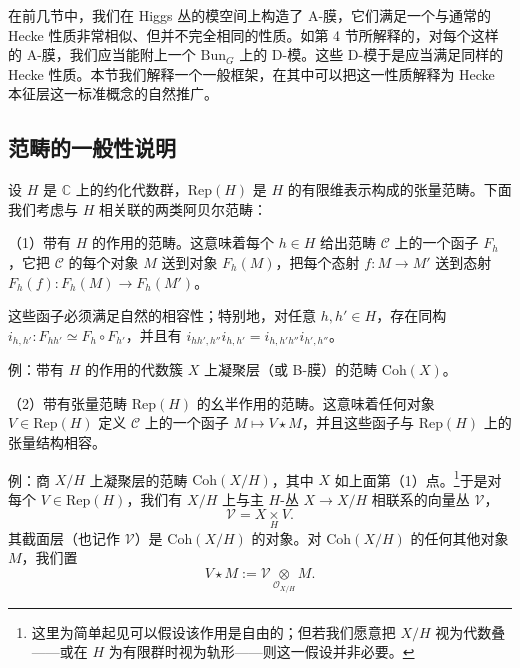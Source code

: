 \documentclass[11pt,a4paper]{article}
\newcommand{\Bun}{\mathrm{Bun}}
\begin{document}
在前几节中，我们在 Higgs 丛的模空间上构造了 A-膜，它们满足一个与通常的 Hecke 性质非常相似、但并不完全相同的性质。如第 4 节所解释的，对每个这样的 A-膜，我们应当能附上一个 $\Bun_G$ 上的 D-模。这些 D-模于是应当满足同样的 Hecke 性质。本节我们解释一个一般框架，在其中可以把这一性质解释为 Hecke 本征层这一标准概念的自然推广。

\subsection{范畴的一般性说明}

设 $H$ 是 $\mathbb{C}$ 上的约化代数群，$\mathrm{Rep}(H)$ 是 $H$ 的有限维表示构成的张量范畴。下面我们考虑与 $H$ 相关联的两类阿贝尔范畴：

（1）带有 $H$ 的作用的范畴。这意味着每个 $h\in H$ 给出范畴 $\mathcal{C}$ 上的一个函子 $F_h$，它把 $\mathcal{C}$ 的每个对象 $M$ 送到对象 $F_h(M)$，把每个态射 $f : M\to M'$ 送到态射 $F_h(f) : F_h(M)\to F_h(M')$。

这些函子必须满足自然的相容性；特别地，对任意 $h,h'\in H$，存在同构 $i_{h,h'} : F_{hh'}\simeq F_h\circ F_{h'}$，并且有 $i_{hh',h''}i_{h,h'} = i_{h,h'h''}i_{h',h''}$。


例：带有 $H$ 的作用的代数簇 $X$ 上凝聚层（或 B-膜）的范畴 $\mathrm{Coh}(X)$。

（2）带有张量范畴 $\mathrm{Rep}(H)$ 的幺半作用的范畴。这意味着任何对象 $V\in\mathrm{Rep}(H)$ 定义 $\mathcal{C}$ 上的一个函子 $M\mapsto V\star M$，并且这些函子与 $\mathrm{Rep}(H)$ 上的张量结构相容。

例：商 $X/H$ 上凝聚层的范畴 $\mathrm{Coh}(X/H)$，其中 $X$ 如上面第（1）点。\footnote{这里为简单起见可以假设该作用是自由的；但若我们愿意把 $X/H$ 视为代数叠——或在 $H$ 为有限群时视为轨形——则这一假设并非必要。}于是对每个 $V\in\mathrm{Rep}(H)$，我们有 $X/H$ 上与主 $H$-丛 $X\to X/H$ 相联系的向量丛 $\mathcal{V}$，
\[
\mathcal{V} = X\underset{H}{\times} V.
\]
其截面层（也记作 $\mathcal{V}$）是 $\mathrm{Coh}(X/H)$ 的对象。对 $\mathrm{Coh}(X/H)$ 的任何其他对象 $M$，我们置
\[
V\star M := \mathcal{V}\underset{\mathcal{O}_{X/H}}{\otimes} M.
\]
\end{document}
